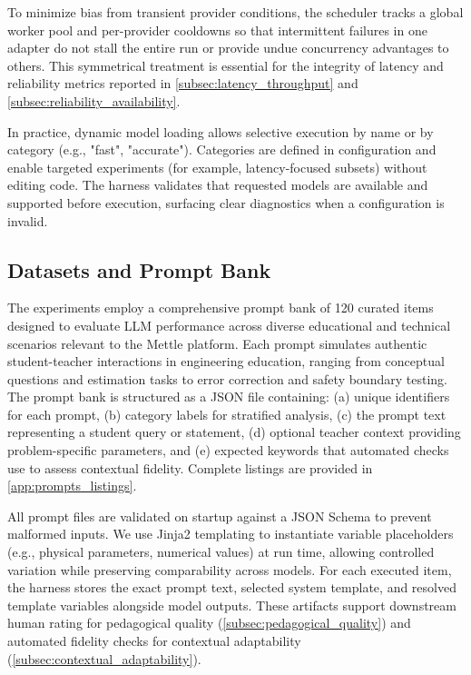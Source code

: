 To minimize bias from transient provider conditions, the scheduler tracks a global worker pool and per-provider cooldowns so that intermittent failures in one adapter do not stall the entire run or provide undue concurrency advantages to others. This symmetrical treatment is essential for the integrity of latency and reliability metrics reported in \cref{subsec:latency_throughput} and \cref{subsec:reliability_availability}.

In practice, dynamic model loading allows selective execution by name or by category (e.g., "fast", "accurate"). Categories are defined in configuration and enable targeted experiments (for example, latency-focused subsets) without editing code. The harness validates that requested models are available and supported before execution, surfacing clear diagnostics when a configuration is invalid.


\subsection{Datasets and Prompt Bank}
\label{subsec:datasets_prompt_bank}

The experiments employ a comprehensive prompt bank of 120 curated items designed to evaluate LLM performance across diverse educational and technical scenarios relevant to the Mettle platform. Each prompt simulates authentic student-teacher interactions in engineering education, ranging from conceptual questions and estimation tasks to error correction and safety boundary testing. The prompt bank is structured as a JSON file containing: (a) unique identifiers for each prompt, (b) category labels for stratified analysis, (c) the prompt text representing a student query or statement, (d) optional teacher context providing problem-specific parameters, and (e) expected keywords that automated checks use to assess contextual fidelity. Complete listings are provided in \cref{app:prompts_listings}.

All prompt files are validated on startup against a JSON Schema to prevent malformed inputs. We use Jinja2 templating to instantiate variable placeholders (e.g., physical parameters, numerical values) at run time, allowing controlled variation while preserving comparability across models. For each executed item, the harness stores the exact prompt text, selected system template, and resolved template variables alongside model outputs. These artifacts support downstream human rating for pedagogical quality (\cref{subsec:pedagogical_quality}) and automated fidelity checks for contextual adaptability (\cref{subsec:contextual_adaptability}).

